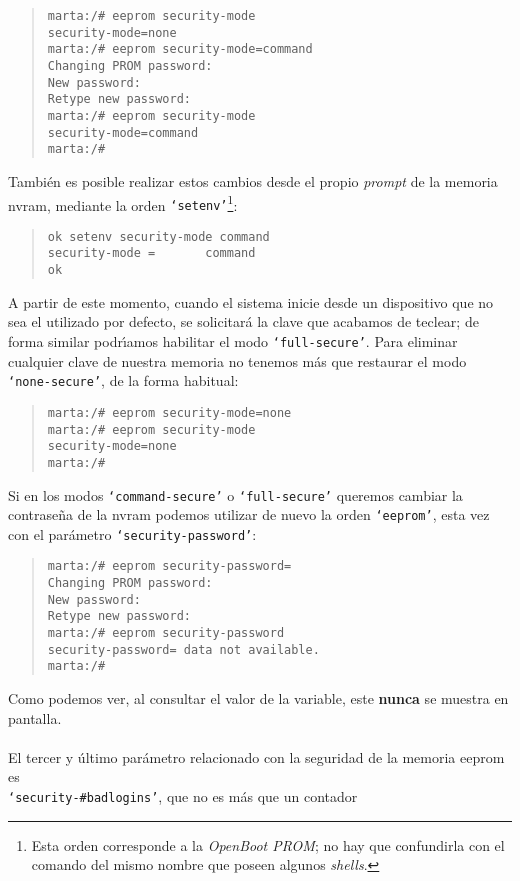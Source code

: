\begin{quote}
\begin{verbatim}
marta:/# eeprom security-mode
security-mode=none
marta:/# eeprom security-mode=command
Changing PROM password:
New password:
Retype new password:
marta:/# eeprom security-mode
security-mode=command
marta:/# 
\end{verbatim}
\end{quote}
Tambi\'en es posible realizar estos cambios desde el propio {\it prompt} de la
memoria {\sc nvram}, mediante la orden {\tt `setenv'}\footnote{Esta orden 
corresponde a la {\it OpenBoot PROM}; no hay que confundirla con el comando
del mismo nombre que poseen algunos {\it shells}.}:
\begin{quote}
\begin{verbatim}
ok setenv security-mode command
security-mode =       command
ok
\end{verbatim}
\end{quote}
A partir de este momento, cuando el sistema inicie desde un dispositivo que
no sea el utilizado por defecto, se solicitar\'a la clave que acabamos de 
teclear; de forma similar podr\'{\i}amos habilitar el modo {\tt `full-secure'}.
Para eliminar cualquier clave de nuestra memoria no tenemos m\'as que restaurar
el modo {\tt `none-secure'}, de la forma habitual:
\begin{quote}
\begin{verbatim}
marta:/# eeprom security-mode=none
marta:/# eeprom security-mode
security-mode=none
marta:/#
\end{verbatim}
\end{quote}
Si en los modos {\tt `command-secure'} o {\tt `full-secure'} queremos 
cambiar la contrase\~na de la {\sc nvram} podemos utilizar de nuevo la
orden {\tt `eeprom'}, esta vez con el par\'ametro {\tt `security-password'}:
\begin{quote}
\begin{verbatim}
marta:/# eeprom security-password=
Changing PROM password:
New password:
Retype new password:
marta:/# eeprom security-password
security-password= data not available.
marta:/# 
\end{verbatim}
\end{quote}
Como podemos ver, al consultar el valor de la variable, este {\bf nunca} se
muestra en pantalla.\\
\\El tercer y \'ultimo par\'ametro relacionado con la seguridad de la memoria 
{\sc eeprom} es {\tt \\`security-\#badlogins'}, que no es m\'as que un contador 
